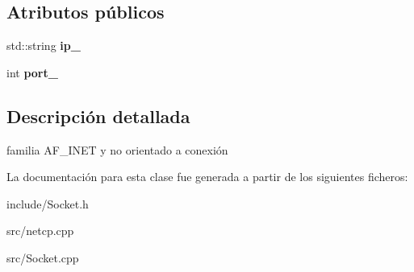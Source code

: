 \subsection*{Atributos públicos}
\begin{DoxyCompactItemize}
\item 
\mbox{\label{classSocket_af80901a563f5fd40f32d7c632818a259}} 
std\+::string {\bfseries ip\+\_\+}
\item 
\mbox{\label{classSocket_a51208d8cfb3628bb68f3faceb86473dc}} 
int {\bfseries port\+\_\+}
\end{DoxyCompactItemize}


\subsection{Descripción detallada}
familia A\+F\+\_\+\+I\+N\+ET y no orientado a conexión 

La documentación para esta clase fue generada a partir de los siguientes ficheros\+:\begin{DoxyCompactItemize}
\item 
include/Socket.\+h\item 
src/netcp.\+cpp\item 
src/Socket.\+cpp\end{DoxyCompactItemize}
